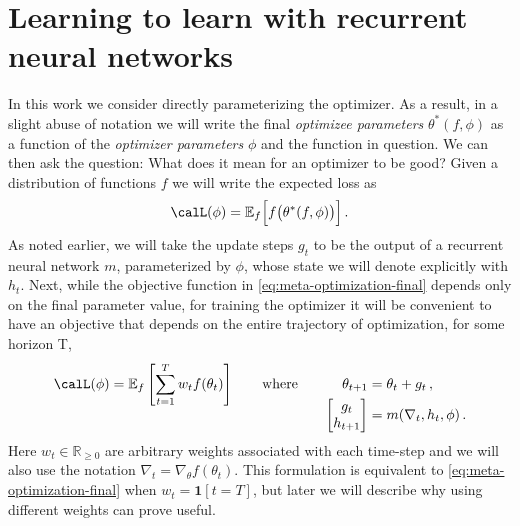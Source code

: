 \section{Learning to learn with recurrent neural networks}
\label{sec:learning-to-learn}


In this work we consider directly parameterizing the optimizer. As a result, in
a slight abuse of notation we will write the final \emph{optimizee parameters}
$\theta^*(f, \phi)$ as a function of the \emph{optimizer parameters} $\phi$ and
the function in question. We can then ask the question: What does it mean for
an optimizer to be good? Given a distribution of functions $f$ we will write
the expected loss as
\begin{equation}
    \calL(\phi) =
    \mathbb{E}_{f} \Big[ f\big(\theta^*(f, \phi)\big) \Big] \,.
    \label{eq:meta-optimization-final}
\end{equation}
As noted earlier, we will take the update steps $g_t$ to be the output of a
recurrent neural network $m$, parameterized by $\phi$, whose
state we will denote explicitly with $h_t$. Next, while the objective function
in \eqref{eq:meta-optimization-final} depends only on the final parameter
value, for training the optimizer it will be convenient to have an objective
that depends on the entire trajectory of optimization, for some horizon T,
\begin{equation}
    \calL(\phi)
    = \mathbb{E}_{f} \left[\sum_{t=1}^T w_t f(\theta_t)\right]
    \qquad\text{where}\qquad
    \begin{aligned}[t]
        \theta_{t+1} &= \theta_t + g_t \,,
        \\
        \begin{bmatrix}
            g_t \\ h_{t+1}
        \end{bmatrix}
        &= m(\nabla_t, h_t, \phi) \,.
    \end{aligned}
    \label{eq:meta-optimization}
\end{equation}
Here $w_t \in \mathbb{R}_{\ge 0}$ are arbitrary weights associated with each
time-step and we will also use the notation $\nabla_t=\nabla_\theta
f(\theta_t)$. This formulation is equivalent to
\eqref{eq:meta-optimization-final} when $w_t = \boldsymbol{1}[t = T]$,
but later we will describe why using different weights can prove useful.

